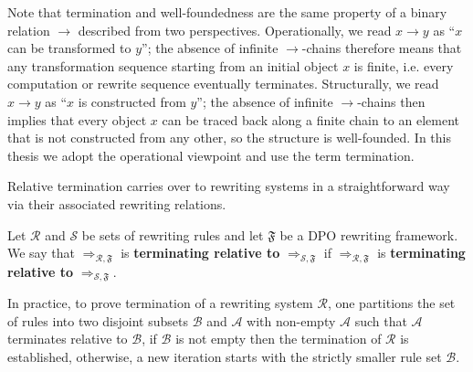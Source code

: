 Note that termination and well-foundedness are the same property of a binary relation $\to$ described from two perspectives. Operationally, we read $x \to y$ as \enquote{$x$ can be transformed to $y$}; the absence of infinite $\rightarrow$-chains therefore means that any transformation sequence starting from an initial object $x$ is finite, i.e. every computation or rewrite sequence eventually terminates. Structurally, we read $x \to y$ as \enquote{$x$ is constructed from $y$}; the absence of infinite $\to$-chains then implies that every object $x$ can be traced back along a finite chain to an element that is not constructed from any other, so the structure is well-founded. In this thesis we adopt the operational viewpoint and use the term termination.

Relative termination 
carries over to rewriting systems in a straightforward way via their associated rewriting relations.
\begin{definition}
    \label{termination:def:relative_termination}
     Let $\mathcal{R}$ and $\mathcal{S}$ be sets of rewriting rules and let $\mathfrak{F}$ be a DPO rewriting framework. 
     We say that $\Rightarrow_{\mathcal{R},\mathfrak{F}}$ is \textbf{terminating relative to} $\Rightarrow_{\mathcal{S}, \mathfrak{F}}$ if 
     $\Rightarrow_{\mathcal{R},\mathfrak{F}}$ is \textbf{terminating relative to} $\Rightarrow_{\mathcal{S}, \mathfrak{F}}$.
\end{definition}
In practice, to prove termination of a rewriting system $\mathcal{R}$, one partitions the set of rules into two disjoint subsets \( \mathcal{B} \) and \( \mathcal{A} \) with non-empty $\mathcal{A}$ such that \( \mathcal{A} \) terminates relative to \( \mathcal{B} \), if $\mathcal{B}$ is not empty then the termination of $\mathcal{R}$ is established, otherwise, a new iteration starts with the strictly smaller rule set $\mathcal{B}$.
 